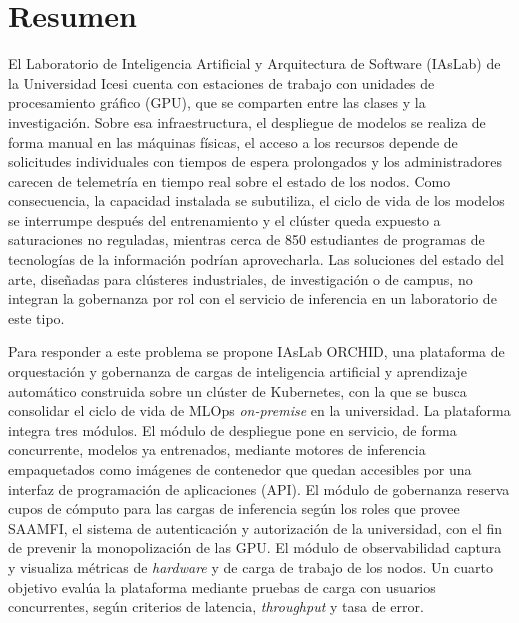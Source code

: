 \documentclass[letterpaper,11pt]{report}
\begin{document}
\listoffigures
\pagebreak

\sloppy

\chapter*{Resumen}

El Laboratorio de Inteligencia Artificial y Arquitectura de Software (IAsLab) de la Universidad Icesi cuenta con estaciones de trabajo con unidades de procesamiento gráfico (GPU), que se comparten entre las clases y la investigación. Sobre esa infraestructura, el despliegue de modelos se realiza de forma manual en las máquinas físicas, el acceso a los recursos depende de solicitudes individuales con tiempos de espera prolongados y los administradores carecen de telemetría en tiempo real sobre el estado de los nodos. Como consecuencia, la capacidad instalada se subutiliza, el ciclo de vida de los modelos se interrumpe después del entrenamiento y el clúster queda expuesto a saturaciones no reguladas, mientras cerca de 850 estudiantes de programas de tecnologías de la información podrían aprovecharla. Las soluciones del estado del arte, diseñadas para clústeres industriales, de investigación o de campus, no integran la gobernanza por rol con el servicio de inferencia en un laboratorio de este tipo.

Para responder a este problema se propone IAsLab ORCHID, una plataforma de orquestación y gobernanza de cargas de inteligencia artificial y aprendizaje automático construida sobre un clúster de Kubernetes, con la que se busca consolidar el ciclo de vida de MLOps \emph{on-premise} en la universidad. La plataforma integra tres módulos. El módulo de despliegue pone en servicio, de forma concurrente, modelos ya entrenados, mediante motores de inferencia empaquetados como imágenes de contenedor que quedan accesibles por una interfaz de programación de aplicaciones (API). El módulo de gobernanza reserva cupos de cómputo para las cargas de inferencia según los roles que provee SAAMFI, el sistema de autenticación y autorización de la universidad, con el fin de prevenir la monopolización de las GPU. El módulo de observabilidad captura y visualiza métricas de \emph{hardware} y de carga de trabajo de los nodos. Un cuarto objetivo evalúa la plataforma mediante pruebas de carga con usuarios concurrentes, según criterios de latencia, \emph{throughput} y tasa de error.
\end{document}
